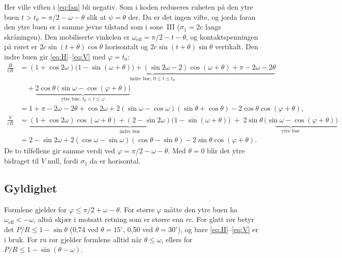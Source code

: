 \documentclass[11pt,a4paper]{article}
\begin{document}
Her ville viften i \eqref{eq:fan} bli negativ.  Som i koden reduseres
ruheten på den ytre buen $t > t_0 = \pi/2 - \omega - \theta$ slik at
$\psi = \theta$ der.  Da er det ingen vifte, og jorda foran den ytre buen er
i samme jevne tilstand som i sone~III ($\sigma_1 = 2c$ langs skråningen).
Den mobiliserte vinkelen er $\omega_\text{eff} = \pi/2 - t - \theta$, og
kontaktspenningen på røret er $2c\sin(t+\theta)\cos\theta$ horisontalt og
$2c\sin(t+\theta)\sin\theta$ vertikalt.  Den indre buen gir
\eqref{eq:H}--\eqref{eq:V} med $\varphi = t_0$:
\begin{align}
  \frac{H}{cR} &= \underbrace{(1+\cos 2\omega)\bigl(1-\sin(\omega+\theta)\bigr)
                  + (\sin 2\omega - 2)\cos(\omega+\theta) + \pi - 2\omega - 2\theta}_{\text{indre bue, } 0 \le t \le t_0} \nonumber\\
               &\quad + \underbrace{2\cos\theta\,\bigl(\sin\omega - \cos(\varphi+\theta)\bigr)}_{\text{ytre bue, } t_0 < t \le \varphi} \nonumber\\
               &= 1 + \pi - 2\omega - 2\theta + \cos 2\omega
                  + 2(\sin\omega - \cos\omega)(\sin\theta + \cos\theta)
                  - 2\cos\theta\cos(\varphi+\theta) ,
  \label{eq:Hpar}\\[6pt]
  \frac{V}{cR} &= \underbrace{(1+\cos 2\omega)\cos(\omega+\theta)
                  + (2 - \sin 2\omega)\bigl(1-\sin(\omega+\theta)\bigr)}_{\text{indre bue}}
                 \;+\; \underbrace{2\sin\theta\,\bigl(\sin\omega - \cos(\varphi+\theta)\bigr)}_{\text{ytre bue}} \nonumber\\
               &= 2 - \sin 2\omega + 2(\cos\omega - \sin\omega)(\cos\theta - \sin\theta)
                  - 2\sin\theta\cos(\varphi+\theta) .
  \label{eq:Vpar}
\end{align}
De to tilfellene gir samme verdi ved $\varphi = \pi/2 - \omega - \theta$.
Med $\theta = 0$ blir det ytre bidraget til $V$ null, fordi $\sigma_1$ da
er horisontal.

\subsection*{Gyldighet}

Formlene gjelder for $\varphi \le \pi/2 + \omega - \theta$.  For større
$\varphi$ måtte den ytre buen ha $\omega_\text{eff} < -\omega$, altså skjær
i motsatt retning som er større enn $rc$.  For glatt rør betyr det
$P/R \le 1 - \sin\theta$ (0,74 ved $\theta = 15^\circ$, 0,50 ved
$\theta = 30^\circ$), og bare \eqref{eq:H}--\eqref{eq:V} er i bruk.  For ru
rør gjelder formlene alltid når $\theta \le \omega$, ellers for
$P/R \le 1 - \sin(\theta - \omega)$.
\end{document}

